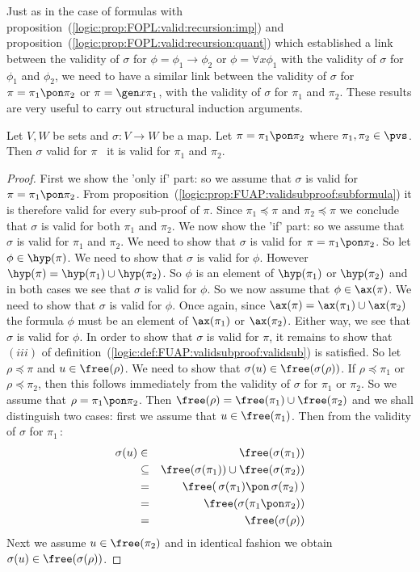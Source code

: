 Just as in the case of formulas with
proposition~(\ref{logic:prop:FOPL:valid:recursion:imp}) and
proposition~(\ref{logic:prop:FOPL:valid:recursion:quant}) which
established a link between the validity of $\sigma$ for
$\phi=\phi_{1}\to\phi_{2}$ or $\phi=\forall x\phi_{1}$ with the
validity of $\sigma$ for $\phi_{1}$ and $\phi_{2}$, we need to have
a similar link between the validity of $\sigma$ for
$\pi=\pi_{1}\pon\pi_{2}$ or $\pi=\gen x\pi_{1}$, with the validity
of $\sigma$ for $\pi_{1}$ and $\pi_{2}$. These results are very
useful to carry out structural induction arguments.

\begin{prop}\label{logic:prop:FUAP:validsubproof:recursion:pon}
Let $V, W$ be sets and $\sigma:V\to W$ be a map. Let
$\pi=\pi_{1}\pon\pi_{2}$ where $\pi_{1},\pi_{2}\in\pvs$. Then
$\sigma$ valid for $\pi$ \ifand\ it is valid for $\pi_{1}$ and
$\pi_{2}$.
\end{prop}
\begin{proof}
First we show the 'only if' part: so we assume that $\sigma$ is
valid for $\pi=\pi_{1}\pon\pi_{2}$. From
proposition~(\ref{logic:prop:FUAP:validsubproof:subformula}) it is
therefore valid for every sub-proof of $\pi$. Since
$\pi_{1}\preceq\pi$ and $\pi_{2}\preceq\pi$ we conclude that
$\sigma$ is valid for both $\pi_{1}$ and $\pi_{2}$. We now show the
'if' part: so we assume that $\sigma$ is valid for $\pi_{1}$ and
$\pi_{2}$. We need to show that $\sigma$ is valid for
$\pi=\pi_{1}\pon\pi_{2}$. So let $\phi\in\hyp(\pi)$. We need to show
that $\sigma$ is valid for $\phi$. However
$\hyp(\pi)=\hyp(\pi_{1})\cup\hyp(\pi_{2})$. So $\phi$ is an element
of $\hyp(\pi_{1})$ or $\hyp(\pi_{2})$ and in both cases we see that
$\sigma$ is valid for $\phi$. So we now assume that
$\phi\in\ax(\pi)$. We need to show that $\sigma$ is valid for
$\phi$. Once again, since $\ax(\pi)=\ax(\pi_{1})\cup\ax(\pi_{2})$
the formula $\phi$ must be an element of $\ax(\pi_{1})$ or
$\ax(\pi_{2})$. Either way, we see that $\sigma$ is valid for
$\phi$. In order to show that $\sigma$ is valid for $\pi$, it
remains to show that $(iii)$ of
definition~(\ref{logic:def:FUAP:validsubproof:validsub}) is
satisfied. So let $\rho\preceq\pi$ and $u\in\free(\rho)$. We need to
show that $\sigma(u)\in\free(\sigma(\rho))$. If $\rho\preceq\pi_{1}$
or $\rho\preceq\pi_{2}$, then this follows immediately from the
validity of $\sigma$ for $\pi_{1}$ or $\pi_{2}$. So we assume that
$\rho=\pi_{1}\pon\pi_{2}$. Then
$\free(\rho)=\free(\pi_{1})\cup\free(\pi_{2})$ and we shall
distinguish two cases: first we assume that $u\in\free(\pi_{1})$.
Then from the validity of $\sigma$ for $\pi_{1}$\,:
    \begin{eqnarray*}
    \sigma(u)&\in&\free(\sigma(\pi_{1}))\\
    &\subseteq&\free(\sigma(\pi_{1}))\cup\free(\sigma(\pi_{2}))\\
    &=&\free(\,\sigma(\pi_{1})\pon\,\sigma(\pi_{2})\,)\\
    &=&\free(\sigma(\pi_{1}\pon\pi_{2}))\\
    &=&\free(\sigma(\rho))
    \end{eqnarray*}
Next we assume $u\in\free(\pi_{2})$ and in identical fashion we
obtain $\sigma(u)\in\free(\sigma(\rho))$.
\end{proof}

